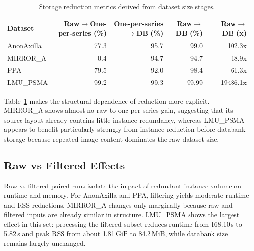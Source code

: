 \begin{table}[htbp]
\centering
\caption{Storage reduction metrics derived from dataset size stages.}
\label{tab:storage-reduction-metrics}
\small
\setlength{\tabcolsep}{5pt}
\begin{tabular}{@{}lrrrr@{}}
\toprule
Dataset & \makecell[c]{Raw$\rightarrow$One-per-series\\(\%)} & \makecell[c]{One-per-series$\rightarrow$DB\\(\%)} & \makecell[c]{Raw$\rightarrow$DB\\(\%)} & \makecell[c]{Raw$\rightarrow$DB\\(x)} \\
\midrule
AnonAxilla & 77.3 & 95.7 & 99.0  & 102.3x \\
MIRROR\_A  & 0.4  & 94.7 & 94.7  & 18.9x \\
PPA        & 79.5 & 92.0 & 98.4  & 61.3x \\
LMU\_PSMA  & 99.2 & 99.3 & 99.99 & 19486.1x \\
\bottomrule
\end{tabular}
\normalsize
\end{table}

Table~\ref{tab:storage-reduction-metrics} makes the structural dependence of reduction more explicit. MIRROR\_A shows almost no raw-to-one-per-series gain, suggesting that its source layout already contains little instance redundancy, whereas LMU\_PSMA appears to benefit particularly strongly from instance reduction before databank storage because repeated image content dominates the raw dataset size.


\subsection{Raw vs Filtered Effects}
Raw-vs-filtered paired runs isolate the impact of redundant instance volume on runtime and memory. For AnonAxilla and PPA, filtering yields moderate runtime and RSS reductions. MIRROR\_A changes only marginally because raw and filtered inputs are already similar in structure. LMU\_PSMA shows the largest effect in this set: processing the filtered subset reduces runtime from 168.10\,s to 5.82\,s and peak RSS from about 1.81\,GiB to 84.2\,MiB, while databank size remains largely unchanged.

